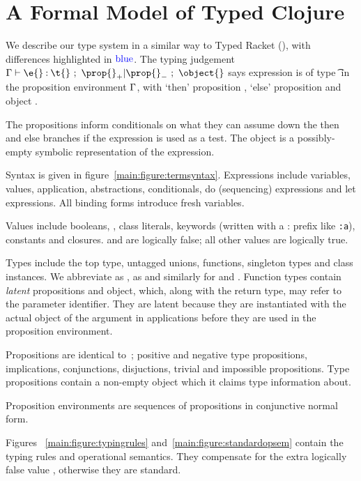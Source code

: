 \section{A Formal Model of Typed Clojure}

We describe our type system in a similar way to Typed Racket (\citet{TF10}),
with differences highlighted in $\mathbin{\textcolor{blue}{\text{blue}}}$.
The typing judgement 
$
{\judgement   {\propenv}
              {\hastype {\e{}} {\t{}}}
  {\filterset {\thenprop {\prop{}}}
              {\elseprop {\prop{}}}}
  {\object{}}}
$
says expression \e{} is of type \t{} in the 
proposition environment $\Gamma{}$, with 
`then' proposition {\thenprop {\prop{}}}, `else' proposition {\elseprop {\prop{}}}
and object \object{}.

The propositions inform conditionals on what they can assume down the then and else
branches if the expression is used as a test.
The object is a possibly-empty symbolic representation of the expression.

Syntax is given in figure~\ref{main:figure:termsyntax}. Expressions include variables, values,
application, abstractions, conditionals, do (sequencing) expressions and let expressions.
All binding forms introduce fresh variables.

Values include booleans, \nil{}, class literals, keywords (written with a : prefix like \texttt{:a}), 
constants and closures.  \false{} and \nil{} are logically false; all other values are logically true.

Types include the top type, untagged unions, functions, singleton types
and class instances. We abbreviate \EmptyUnion{} as \Bot{}, {\ValueNil} as \Nil{} and similarly
for \True and \False.
Function types contain \emph{latent} propositions and object, which, along with the return type,
may refer to the parameter identifier. They are latent because they are instantiated with the
actual object of the argument in applications before they are used in the proposition environment.

Propositions are identical to~\cite{TF10}; positive and negative type propositions, implications,
conjunctions, disjuctions, trivial and impossible propositions.
Type propositions contain a non-empty object which it claims type information about.

Proposition environments are sequences of propositions in conjunctive normal form.

Figures ~\ref{main:figure:typingrules} and~\ref{main:figure:standardopsem}
contain the typing rules and operational semantics.
They compensate for the extra logically false value \nil{}, otherwise they are standard.

